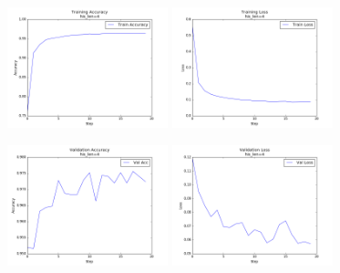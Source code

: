 \documentclass[a4paper]{article}
\begin{document}
\begin{minipage}[t]{0.45\textwidth}
\includegraphics[height=3.5cm,width=\textwidth]{train_acc_default.png}
\includegraphics[height=3.5cm,width=\textwidth]{train_loss_default.png}
\end{minipage}
\begin{minipage}[t]{0.45\textwidth}
\includegraphics[height=3.5cm,width=\textwidth]{val_acc_default.png}
\includegraphics[height=3.5cm,width=\textwidth]{val_loss_default.png}

\end{minipage}
\end{document}
